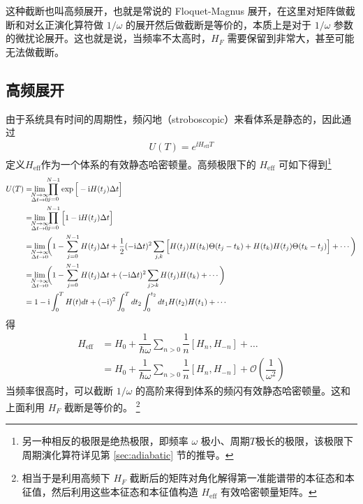 这种截断也叫高频展开\cite{highfreq2015}，也就是常说的 Floquet-Magnus 展开\cite{floquet-magnus-2001}，在这里对矩阵做截断和对幺正演化算符做 $1/\omega$ 的展开然后做截断是等价的\cite{highfreq2015}，本质上是对于 $1/\omega$ 参数的微扰论展开。这也就是说，当频率不太高时，$H_F$ 需要保留到非常大，甚至可能无法做截断。

\subsection{高频展开} \label{sec:highfreq}
由于系统具有时间的周期性，频闪地（stroboscopic）来看体系是静态的，因此通过
\begin{align}
U(T) = e^{\ii H_{\text{eff}}T}
\end{align}
定义$H_{\text{eff}}$作为一个体系的有效静态哈密顿量。高频极限下的 $H_{\text{eff}}$ 可如下得到\footnote{另一种相反的极限是绝热极限，即频率 $\omega$ 极小、周期$T$极长的极限，该极限下周期演化算符详见第 \ref{sec:adiabatic} 节的推导。}
\begin{align}
U(T)&= \lim_{\mathclap{\substack{N\rightarrow\infty\\\Delta t\rightarrow0}}}\prod_{j=0}^{N-1}\exp\Big[-\ii H(t_j)\Delta t\Big]\\
    &= \lim_{\mathclap{\substack{N\rightarrow\infty\\\Delta t\rightarrow0}}}\prod_{j=0}^{N-1}\Big[1-\ii H(t_j)\Delta t\Big]\\
    &= \lim_{\mathclap{\substack{N\rightarrow\infty\\\Delta t\rightarrow0}}}\bigg(1-\sum_{j=0}^{N-1}H(t_j)\Delta t+\dfrac{1}{2}(-\ii\Delta t)^2\sum_{j,k}\Big[H(t_j)H(t_k)\Theta(t_j-t_k)+H(t_k)H(t_j)\Theta(t_k-t_j)\Big]+\cdots\bigg)\\
    &= \lim_{\mathclap{\substack{N\rightarrow\infty\\\Delta t\rightarrow0}}}\bigg(1-\sum_{j=0}^{N-1}H(t_j)\Delta t+(-\ii\Delta t)^2\sum_{j>k}H(t_j)H(t_k)+\cdots\bigg)\\
    &= 1-\ii\int_0^TH(t)dt+(-\ii)^2\int_0^Tdt_2\int_0^{t_2}dt_1H(t_2)H(t_1)+\cdots
\end{align}
得
\begin{align}
H_{\text{eff}} &= H_0+\dfrac{1}{\hbar\omega}\sum_{n>0}\dfrac{1}{n}[H_n,H_{-n}]+\ldots \\ 
&= H_0+\dfrac{1}{\hbar\omega}\sum_{n>0}\dfrac{1}{n}[H_n,H_{-n}]+\mathcal{O}(\dfrac{1}{\omega^2}) \label{eq:heffderive}
\end{align}
当频率很高时，可以截断 $1/\omega$ 的高阶来得到体系的频闪有效静态哈密顿量。这和上面利用 $H_F$ 截断是等价的。
\footnote{相当于是利用高频下 $H_F$ 截断后的矩阵对角化解得第一准能谱带的本征态和本征值，然后利用这些本征态和本征值构造 $H_{\text{eff}}$ 有效哈密顿量矩阵。}







